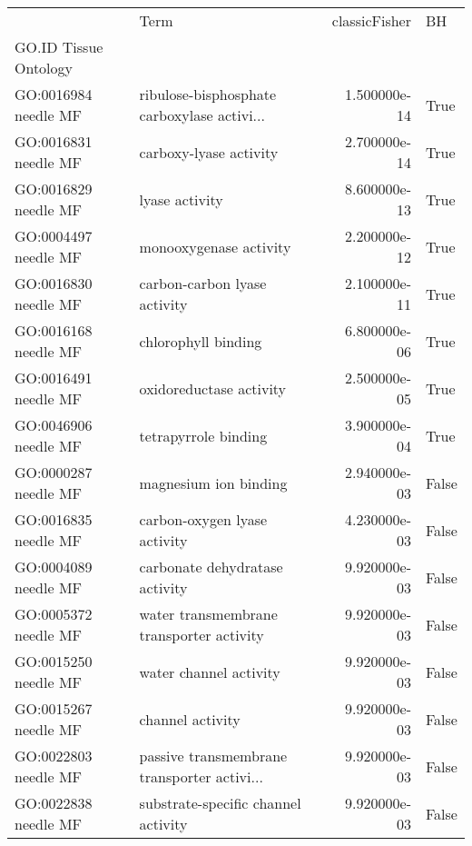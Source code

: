 \begin{tabular}{llrl}
\toprule
{} &                                         Term &  classicFisher &     BH \\
GO.ID      Tissue Ontology &                                              &                &        \\
GO:0016984 needle MF       &  ribulose-bisphosphate carboxylase activi... &   1.500000e-14 &   True \\
\midrule
GO:0016831 needle MF       &                       carboxy-lyase activity &   2.700000e-14 &   True \\
GO:0016829 needle MF       &                               lyase activity &   8.600000e-13 &   True \\
GO:0004497 needle MF       &                       monooxygenase activity &   2.200000e-12 &   True \\
GO:0016830 needle MF       &                 carbon-carbon lyase activity &   2.100000e-11 &   True \\
GO:0016168 needle MF       &                          chlorophyll binding &   6.800000e-06 &   True \\
GO:0016491 needle MF       &                      oxidoreductase activity &   2.500000e-05 &   True \\
GO:0046906 needle MF       &                         tetrapyrrole binding &   3.900000e-04 &   True \\
GO:0000287 needle MF       &                        magnesium ion binding &   2.940000e-03 &  False \\
GO:0016835 needle MF       &                 carbon-oxygen lyase activity &   4.230000e-03 &  False \\
GO:0004089 needle MF       &               carbonate dehydratase activity &   9.920000e-03 &  False \\
GO:0005372 needle MF       &     water transmembrane transporter activity &   9.920000e-03 &  False \\
GO:0015250 needle MF       &                       water channel activity &   9.920000e-03 &  False \\
GO:0015267 needle MF       &                             channel activity &   9.920000e-03 &  False \\
GO:0022803 needle MF       &  passive transmembrane transporter activi... &   9.920000e-03 &  False \\
GO:0022838 needle MF       &          substrate-specific channel activity &   9.920000e-03 &  False \\

\end{tabular}
